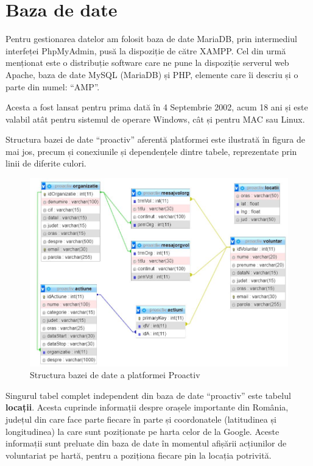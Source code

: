 \documentclass[12pt,a4paper]{report}
\begin{document}
\chapter{Baza de date}
\par
Pentru gestionarea datelor am folosit baza de date MariaDB, prin intermediul interfeței PhpMyAdmin, pusă la dispoziție de către XAMPP. Cel din urmă menționat este o distribuție software care ne pune la dispoziție serverul web Apache, baza de date MySQL (MariaDB) și PHP, elemente care îi descriu și o parte din numel: “AMP”. 
\par
Acesta a fost lansat pentru prima dată în 4 Septembrie 2002, acum 18 ani și este valabil atât pentru sistemul de operare Windows, cât și pentru MAC sau Linux.
\\\par
Structura bazei de date “proactiv” aferentă platformei este ilustrată în figura de mai jos, precum și conexiunile și dependențele dintre tabele, reprezentate prin linii de diferite culori.
\\
\begin{figure}[H]
\centering
  \includegraphics[width=1\linewidth]{./imagini/bazadate.jpg}
  \caption{Structura bazei de date a platformei Proactiv}
\end{figure}
\par
Singurul tabel complet independent din baza de date “proactiv” este tabelul \textbf{locații}. Acesta cuprinde informații despre orașele importante din România, județul din care face parte fiecare în parte și coordonatele (latitudinea și longitudinea) la care sunt poziționate pe harta celor de la Google. Aceste informații sunt preluate din baza de date în momentul afișării acțiunilor de voluntariat pe hartă, pentru a poziționa fiecare pin la locația potrivită.
\end{document}
